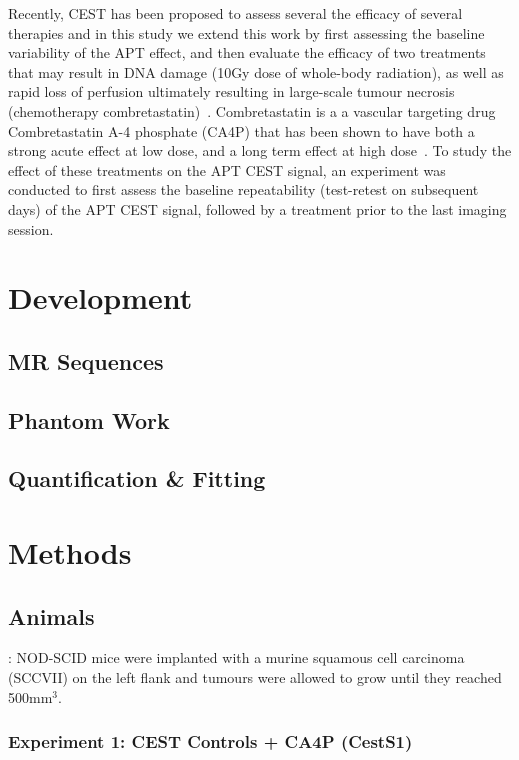Recently, CEST has been proposed to assess several the efficacy of several therapies and in this study we extend this work by first assessing the baseline variability of the APT effect, and then evaluate the efficacy of two treatments that may result in DNA damage (10Gy dose of whole-body radiation), as well as rapid loss of perfusion ultimately resulting in large-scale tumour necrosis (chemotherapy combretastatin)~\cite{Maxwell:2002da}.
Combretastatin is a a vascular targeting drug Combretastatin A-4 phosphate (CA4P) that has been shown to have both a strong acute effect at low dose, and a long term effect at high dose~\cite{Maxwell:2002da}.
To study the effect of these treatments on the APT CEST signal, an experiment was conducted to first assess the baseline repeatability (test-retest on subsequent days) of the APT CEST signal, followed by a treatment prior to the last imaging session.

\section{Development}

\subsection{MR Sequences}

\subsection{Phantom Work}

\subsection{Quantification \& Fitting}

\section{Methods}

\subsection{Animals}: NOD-SCID mice were implanted with a murine squamous cell carcinoma (SCCVII) on the left flank and tumours were allowed to grow until they reached 500mm$^3$.


\subsubsection{Experiment 1: CEST Controls + CA4P (CestS1)}

